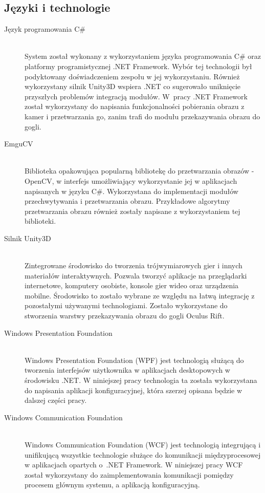 \documentclass[a4paper,11pt,twoside]{report}
\theoremstyle{definition}
\begin{document}
\subsection{Języki i technologie }
\begin{description}
\item [Język programowania C\# ] \hfill \\
System został wykonany z wykorzystaniem języka programowania C\# oraz platformy programistycznej .NET Framework. Wybór tej technologii był podyktowany doświadczeniem zespołu w jej wykorzystaniu. Również wykorzystany silnik Unity3D wspiera .NET co sugerowało uniknięcie przyszłych problemów integracją modułów. W~pracy .NET Framework został wykorzystany do napisania funkcjonalności pobierania obrazu z kamer i przetwarzania go, zanim trafi do modułu przekazywania obrazu do gogli.

\item [EmguCV] \hfill \\
Biblioteka opakowująca popularną bibliotekę do przetwarzania obrazów - OpenCV, w interfejs umożliwiający wykorzystanie jej w aplikacjach napisanych w języku C\#. Wykorzystana do implementacji modułów przechwytywania i przetwarzania obrazu. Przykładowe algorytmy przetwarzania obrazu również zostały napisane z wykorzystaniem tej biblioteki. 

\item [Silnik Unity3D] \hfill \\
Zintegrowane środowisko do tworzenia trójwymiarowych gier i innych materiałów interaktywnych.  Pozwala tworzyć aplikacje na przeglądarki internetowe, komputery osobiste, konsole gier wideo oraz urządzenia mobilne. Środowisko to zostało wybrane ze względu na łatwą integrację z pozostałymi używanymi technologiami. Zostało wykorzystane do stworzenia warstwy przekazywania obrazu do gogli Oculus Rift.

\item [Windows Presentation Foundation] \hfill \\
Windows Presentation Foundation (WPF) jest technologią służącą do tworzenia interfejsów użytkownika w aplikacjach desktopowych w środowisku .NET. W niniejszej pracy technologia ta została wykorzystana do napisania aplikacji konfiguracyjnej, która szerzej opisana będzie w dalszej części pracy.

\item [Windows Communication Foundation] \hfill \\
Windows Communication Foundation (WCF) jest technologią integrującą i unifikującą wszystkie technologie służące do komunikacji międzyprocesowej w aplikacjach opartych o~.NET Framework. W niniejszej pracy WCF został wykorzystany do zaimplementowania komunikacji pomiędzy procesem głównym systemu, a aplikacją konfiguracyjną.
\end{description}
\end{document}

